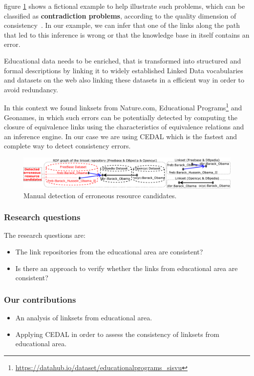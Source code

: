 figure \ref{fig:example} shows a fictional example to help illustrate such problems, which can be classified as \textbf{contradiction problems}, according to the quality dimension of consistency~\cite{zaveri2015quality}. 
In our example, we can infer that one of the links along the path that led to this inference is wrong or that the knowledge base in itself contains an error. 

Educational data needs to be enriched, that is transformed into structured and formal descriptions by linking it to widely established Linked Data vocabularies and datasets on the web also linking these datasets in a efficient way in order to avoid redundancy.

In this context we found linksets from Nature.com, Educational Programs\footnote{\url{https://datahub.io/dataset/educationalprograms_sisvu}} and Geonames, in which such errors can be potentially detected by computing the closure of equivalence links using the characteristics of equivalence relations and an inference engine. In our case we are using CEDAL \cite{cedal2017} which is the fastest and complete way to detect consistency errors. 

\begin{figure}[htb] 
	\centering
	\includegraphics[width=1.0\linewidth]{img/example8.pdf}
	\caption{Manual detection of erroneous resource candidates.}
	\label{fig:example}
\end{figure} 

\subsubsection{Research questions}

The research questions are:
\begin{itemize}
    \item The link repositories from the educational area are consistent?
    \item Is there an approach to verify whether the links from educational area are consistent?
\end{itemize}


\subsubsection{Our contributions}
\begin{itemize}
    \item An analysis of linksets from educational area.
    \item Applying CEDAL\cite{valdestilhas2017cedal} in order to assess the consistency of linksets from educational area.
\end{itemize}

